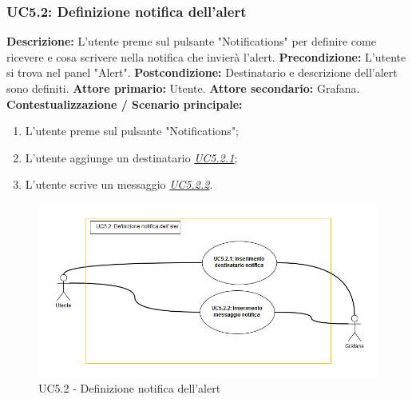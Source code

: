                 \subsubsection{UC5.2: Definizione notifica dell'alert }
                    \textbf{Descrizione:} L’utente preme sul pulsante "Notifications" per definire come ricevere e cosa scrivere nella notifica che invierà l'alert.
                    \newline
                    \textbf{Precondizione:} L'utente si trova nel panel "Alert".
                    \newline
                    \textbf{Postcondizione:} Destinatario e descrizione dell'alert sono definiti.
                    \newline
                    \textbf{Attore primario:} Utente.
                    \newline
                    \textbf{Attore secondario:} Grafana.
                    \newline
                    \textbf{Contestualizzazione / Scenario principale:} \begin{enumerate}
                            \item L'utente preme sul pulsante "Notifications";
                            \item L'utente aggiunge un destinatario \underline{\textit{UC5.2.1}};
                            \item L'utente scrive un messaggio \underline{\textit{UC5.2.2}}.
                        \end{enumerate}
                        \clearpage
                        \begin{figure}[!htbp]
                    	\centering
                    	\includegraphics[width=\textwidth]{UC5-2.png}
                    	\caption{UC5.2 - Definizione notifica dell'alert}
                    	\label{uc5.2}
                    \end{figure}  
                        
